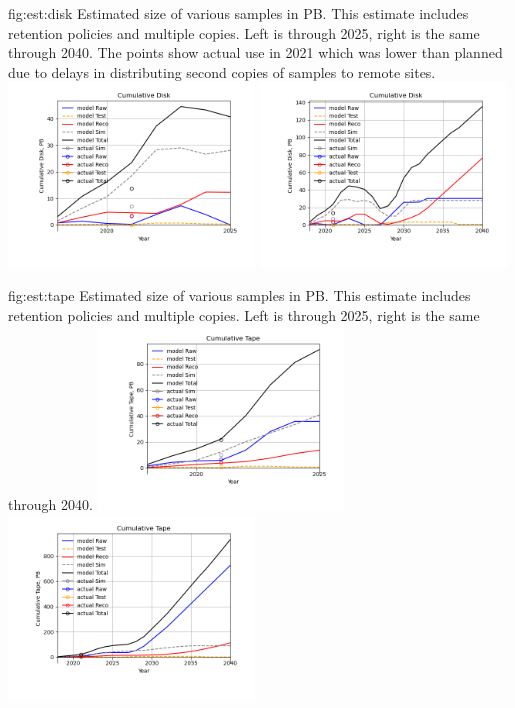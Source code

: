 \documentclass[../main-v1.tex]{subfiles}
\begin{document}
\begin{dunefigure}
{fig:est:disk}
{Estimated size of various samples in PB. This estimate includes retention policies and multiple copies. Left is through 2025, right is the same through 2040. The points show actual use in 2021 which was lower than planned due to delays in distributing second copies of samples to remote sites.}
\includegraphics[width=0.49\textwidth]{graphics/IntroFigures/2025/Parameters_2022-03-04-2025-Cumulative-Disk.png}
\includegraphics[width=0.49\textwidth]{graphics/IntroFigures/2040/Parameters_2022-03-04-2040-Cumulative-Disk.png}
\end{dunefigure}

\begin{dunefigure}
{fig:est:tape}
{Estimated size of various samples in PB. This estimate includes retention policies and multiple copies. Left is through 2025, right is the same through 2040.}
\includegraphics[width=0.49\textwidth]{graphics/IntroFigures/2025/Parameters_2022-03-04-2025-Cumulative-Tape.png}
\includegraphics[width=0.49\textwidth]{graphics/IntroFigures/2040/Parameters_2022-03-04-2040-Cumulative-Tape.png}

\end{dunefigure}
\end{document}
